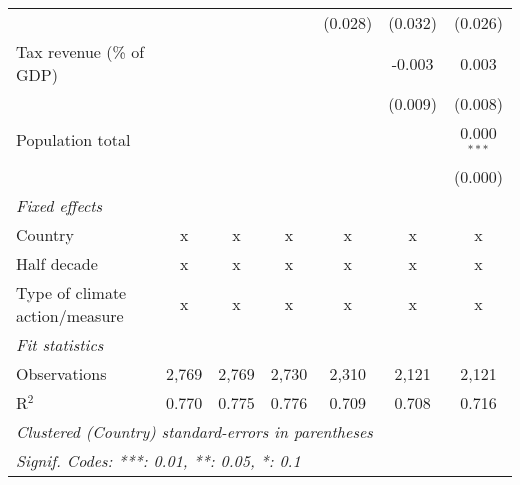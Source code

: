 \begin{tabular}{lcccccc}
                                                            &         &              &               & (0.028)        & (0.032)        & (0.026)\\   
   Tax revenue (\% of GDP)                                  &         &              &               &                & -0.003         & 0.003\\   
                                                            &         &              &               &                & (0.009)        & (0.008)\\   
   Population total                                         &         &              &               &                &                & 0.000$^{***}$\\   
                                                            &         &              &               &                &                & (0.000)\\   
   \emph{Fixed effects}\\
   Country                                                  & x       & x            & x             & x              & x              & x\\  
   Half decade                                              & x       & x            & x             & x              & x              & x\\  
   Type of climate action/measure                           & x       & x            & x             & x              & x              & x\\  
   \midrule \emph{Fit statistics}\\
   Observations                                             & 2,769   & 2,769        & 2,730         & 2,310          & 2,121          & 2,121\\  
   R$^2$                                                    & 0.770   & 0.775        & 0.776         & 0.709          & 0.708          & 0.716\\  
   \midrule
   \multicolumn{7}{l}{\emph{Clustered (Country) standard-errors in parentheses}}\\
   \multicolumn{7}{l}{\emph{Signif. Codes: ***: 0.01, **: 0.05, *: 0.1}}\\
\end{tabular}
\par\endgroup


